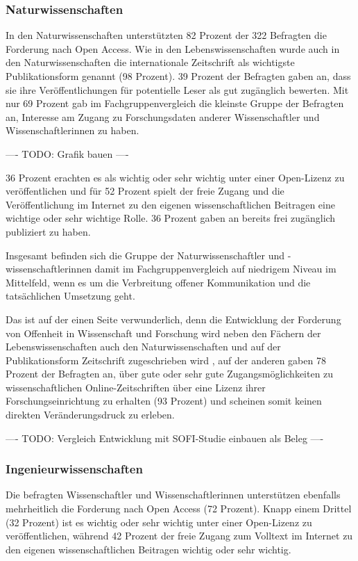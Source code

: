 \subsubsection{Naturwissenschaften}

In den Naturwissenschaften unterstützten 82 Prozent der 322 Befragten die Forderung nach Open Access. Wie in den Lebenswissenschaften wurde auch in den Naturwissenschaften die internationale Zeitschrift als wichtigste Publikationsform genannt (98 Prozent). 39 Prozent der Befragten gaben an, dass sie ihre Veröffentlichungen für potentielle Leser als gut zugänglich bewerten. Mit nur 69 Prozent gab im Fachgruppenvergleich die kleinste Gruppe der Befragten an, Interesse am Zugang zu Forschungsdaten anderer Wissenschaftler und Wissenschaftlerinnen zu haben.

---- TODO: Grafik bauen  ----

36 Prozent erachten es als wichtig oder sehr wichtig unter einer Open-Lizenz zu veröffentlichen und für 52 Prozent spielt der freie Zugang und die Veröffentlichung im Internet zu den eigenen wissenschaftlichen Beitragen eine wichtige oder sehr wichtige Rolle. 36 Prozent gaben an bereits frei zugänglich publiziert zu haben.

Insgesamt befinden sich die Gruppe der Naturwissenschaftler und -wissenschaftlerinnen damit im Fachgruppenvergleich auf niedrigem Niveau im Mittelfeld, wenn es um die Verbreitung offener Kommunikation und die tatsächlichen Umsetzung geht.

Das ist auf der einen Seite verwunderlich, denn die Entwicklung der Forderung von Offenheit in Wissenschaft und Forschung wird neben den Fächern der Lebenswissenschaften auch den Naturwissenschaften und auf der Publikationsform Zeitschrift zugeschrieben wird \cite{suchen}, auf der anderen gaben 78 Prozent der Befragten an, über gute oder sehr gute Zugangsmöglichkeiten zu wissenschaftlichen Online-Zeitschriften über eine Lizenz ihrer Forschungseinrichtung zu erhalten (93 Prozent) und scheinen somit keinen direkten Veränderungsdruck zu erleben.

---- TODO: Vergleich Entwicklung mit SOFI-Studie einbauen als Beleg ----

\subsubsection{Ingenieurwissenschaften}

Die befragten Wissenschaftler und Wissenschaftlerinnen unterstützen ebenfalls mehrheitlich die Forderung nach Open Access (72 Prozent). Knapp einem Drittel (32 Prozent) ist es wichtig oder sehr wichtig unter einer Open-Lizenz zu veröffentlichen, während 42 Prozent der freie Zugang zum Volltext im Internet zu den eigenen wissenschaftlichen Beitragen wichtig oder sehr wichtig.

